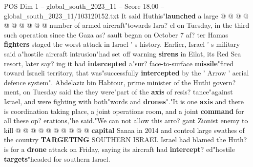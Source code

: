 \begin{textsample}{POS Dim 1 – global\_south\_2023\_11 – Score 18.00 – global\_south\_2023\_11/103120152.txt}
It said Huthis"\textbf{launched} a large @ @ @ @ @ @ @ @ @ @ number of armed aircraft"towards Isra? el on Tuesday, in the third such operation since the Gaza as? sault began on October 7 af? ter Hamas \textbf{fighters} staged the worst attack in Israel ' s history.
Earlier, Israel ' s military said a"hostile aircraft intrusion"had set off warning \textbf{sirens} in Eilat, its Red Sea resort, later say? ing it had \textbf{intercepted} a"sur? face-to-surface \textbf{missile}"fired toward Israeli territory, that was"successfully \textbf{intercepted} by the ' Arrow ' aerial defence system".
Abdelaziz bin Habtour, prime minister of the Huthi govern? ment, on Tuesday said the they were"part of the \textbf{axis} of resis? tance"against Israel, and were fighting with both"words and \textbf{drones}"."It is one \textbf{axis} and there is coordination taking place, a joint operations room, and a joint \textbf{command} for all these op? erations,"he said."We can not allow this arro? gant Zionist enemy to kill @ @ @ @ @ @ @ @ @ @ \textbf{capital} Sanaa in 2014 and control large swathes of the country \textbf{TARGETING} SOUTHERN ISRAEL Israel had blamed the Huth? is for a \textbf{drone} attack on Friday, saying its aircraft had \textbf{intercept}? ed"hostile \textbf{targets}"headed for southern Israel.

\end{textsample}
